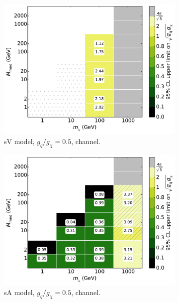 \begin{figure}
\begin{subfigure}[t]{0.32\textwidth}
    \centering
    \includegraphics[width=1.\textwidth]{figures/grid_basepoints_SVD_rat5_monoWZ.pdf}
    \caption{sV model, $g_q/g_{\chi} = 0.5$, \monoWZ channel.}
    \vspace{0.75cm}
  \end{subfigure}
  \begin{subfigure}[t]{0.32\textwidth}
    \centering
    \includegraphics[width=1.\textwidth]{figures/grid_basepoints_SVD_rat5_monojet.pdf} %
    \caption{sA model, $g_q/g_{\chi} = 0.5$, \monojet channel.}
  \end{subfigure}
  \begin{subfigure}[t]{0.32\textwidth}
    \centering

\end{subfigure}
\end{figure}
